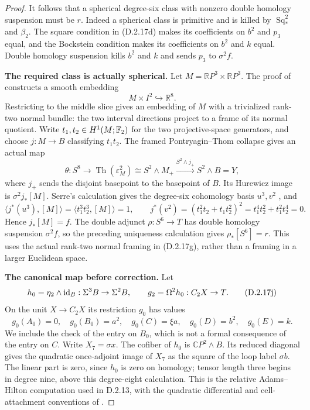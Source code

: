 \begin{proof}
It follows that a spherical degree-six class with nonzero double
homology suspension must be $r$. Indeed a spherical class is primitive
and is killed by $\operatorname{Sq}_*^2$ and $\beta_2$. The square
condition in \textup{(D.2.17d)} makes its coefficients on $b^2$ and
$p_3$ equal, and the Bockstein condition makes its coefficients on
$b^2$ and $k$ equal. Double homology suspension kills $b^2$ and $k$
and sends $p_3$ to $\sigma^2f$.

\medskip\noindent
\textbf{The required class is actually spherical.}
Let $M=\mathbb RP^3\times\mathbb RP^3$.
The proof of \cite[Theorem~1.1, p.~9]{EH5AkhmetievRepovsSkopenkov2001}
constructs a smooth embedding
\[
 M\times I^2\hookrightarrow\mathbb R^8.
 \tag{D.2.17g}
\]
Restricting to the middle slice gives an embedding of $M$ with a
trivialized rank-two normal bundle: the two interval directions
project to a frame of its normal quotient. Write
$t_1,t_2\in H^1(M;\mathbb F_2)$ for the two projective-space generators,
and choose $j:M\to B$ classifying $t_1t_2$. The framed
Pontryagin--Thom collapse gives an actual map
\[
 \theta:S^8\longrightarrow
 \operatorname{Th}(\varepsilon_M^2)
 \cong S^2\wedge M_+
 \xrightarrow{S^2\wedge j_+} S^2\wedge B=Y,
 \tag{D.2.17h}
\]
where $j_+$ sends the disjoint basepoint to the basepoint of $B$.
Its Hurewicz image is $\sigma^2j_*[M]$. Serre's calculation gives
the degree-six cohomology basis $u^3,v^2$
\cite[\S2, nos.~8--9, pp.~203--204]{I_Serre1953}, and
\[
 \langle j^*(u^3),[M]\rangle
   =\langle t_1^3t_2^3,[M]\rangle=1,
 \qquad
 j^*(v^2)=(t_1^2t_2+t_1t_2^2)^2
          =t_1^4t_2^2+t_1^2t_2^4=0.
 \tag{D.2.17i}
\]
Hence $j_*[M]=f$. The double adjunct $\rho:S^6\to T$ has double
homology suspension $\sigma^2f$, so the preceding uniqueness
calculation gives $\rho_*[S^6]=r$. This uses the actual rank-two
normal framing in \textup{(D.2.17g)}, rather than a framing in a
larger Euclidean space.

\medskip\noindent
\textbf{The canonical map before correction.}
Let
\[
 h_0=\eta_2\wedge\mathrm{id}_B:\Sigma^3B\to\Sigma^2B,
 \qquad
 g_2=\Omega^2h_0:C_2X\to T.
 \tag{D.2.17j}
\]
On the unit $X\to C_2X$ its restriction $g_0$ has values
\[
 g_0(A_0)=0,\quad g_0(B_0)=a^2,\quad g_0(C)=\xi a,
 \quad g_0(D)=b^2,\quad g_0(E)=k.
 \tag{D.2.17k}
\]
We include the check of the entry on $B_0$, which is not a formal
consequence of the entry on $C$. Write $X_7=\sigma x$.
The cofiber of $h_0$ is $\mathbb CP^2\wedge B$. Its reduced
diagonal gives the quadratic once-adjoint image of $X_7$ as the
square of the loop label $\sigma b$. The linear part is zero,
since $h_0$ is zero on homology; tensor length three begins in
degree nine, above this degree-eight calculation. This is the
relative Adams--Hilton computation used in D.2.13, with the
quadratic differential and cell-attachment conventions of
\cite[\S3.1, p.~300; proof of Proposition~7.4, p.~309]{FGHHalperinLemaire1995}.


\end{proof}
